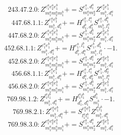 \documentclass[letterpaper,10pt,fleqn,leqno,onecolumn]{article}
\begin{document}
\begin{equation} \;\;\;\;\;\;  243.47.2.0: Z^{e_{1}^{a}e_{2}^{a}e_{1}^{b}}_{m_{1}^{a}m_{2}^{a}m_{1}^{b}}+=S^{e_{1}^{a},d_{1}^{a}}_{m_{1}^{a}m_{2}^{a}}Z^{e_{2}^{a}e_{1}^{b}}_{m_{1}^{b},d_{1}^{a}} \end{equation}
\begin{equation} \;\;\;\;\;\;  447.68.1.1: Z^{e_{1}^{a}e_{1}^{b}}_{m_{1}^{b},d_{1}^{a}}+=H^{e_{1}^{b},l_{1}^{a}}_{d_{1}^{b},d_{1}^{a}}S^{e_{1}^{a},d_{1}^{b}}_{m_{1}^{b},l_{1}^{a}} \end{equation}
\begin{equation} \;\;\;\;\;\;  447.68.2.0: Z^{e_{1}^{a}e_{2}^{a}e_{1}^{b}}_{m_{1}^{a}m_{2}^{a}m_{1}^{b}}+=S^{e_{1}^{a},d_{1}^{a}}_{m_{1}^{a}m_{2}^{a}}Z^{e_{2}^{a}e_{1}^{b}}_{m_{1}^{b},d_{1}^{a}} \end{equation}
\begin{equation} \;\;\;\;\;\;  452.68.1.1: Z^{e_{1}^{a}e_{1}^{b}}_{m_{1}^{b},d_{1}^{a}}+=H^{e_{1}^{a},l_{1}^{b}}_{d_{1}^{b},d_{1}^{a}}S^{e_{1}^{b},d_{1}^{b}}_{m_{1}^{b},l_{1}^{b}}\cdot -1. \end{equation}
\begin{equation} \;\;\;\;\;\;  452.68.2.0: Z^{e_{1}^{a}e_{2}^{a}e_{1}^{b}}_{m_{1}^{a}m_{2}^{a}m_{1}^{b}}+=S^{e_{1}^{a},d_{1}^{a}}_{m_{1}^{a}m_{2}^{a}}Z^{e_{2}^{a}e_{1}^{b}}_{m_{1}^{b},d_{1}^{a}} \end{equation}
\begin{equation} \;\;\;\;\;\;  456.68.1.1: Z^{e_{1}^{a}e_{1}^{b}}_{m_{1}^{b},d_{1}^{a}}+=H^{e_{1}^{a},l_{1}^{a}}_{d_{1}^{a},d_{2}^{a}}S^{e_{1}^{b},d_{2}^{a}}_{m_{1}^{b},l_{1}^{a}} \end{equation}
\begin{equation} \;\;\;\;\;\;  456.68.2.0: Z^{e_{1}^{a}e_{2}^{a}e_{1}^{b}}_{m_{1}^{a}m_{2}^{a}m_{1}^{b}}+=S^{e_{1}^{a},d_{1}^{a}}_{m_{1}^{a}m_{2}^{a}}Z^{e_{2}^{a}e_{1}^{b}}_{m_{1}^{b},d_{1}^{a}} \end{equation}
\begin{equation} \;\;\;\;\;\;  769.98.1.2: Z^{l_{1}^{a}l_{1}^{b}}_{m_{1}^{b},d_{1}^{a}}+=H^{l_{1}^{a}l_{1}^{b}}_{d_{1}^{b},d_{1}^{a}}S^{d_{1}^{b}}_{m_{1}^{b}}\cdot -1. \end{equation}
\begin{equation} \;\;\;\;\;\;  769.98.2.1: Z^{e_{1}^{a}e_{1}^{b}}_{m_{1}^{b},d_{1}^{a}}+=S^{e_{1}^{a}e_{1}^{b}}_{l_{1}^{a}l_{1}^{b}}Z^{l_{1}^{a}l_{1}^{b}}_{m_{1}^{b},d_{1}^{a}} \end{equation}
\begin{equation} \;\;\;\;\;\;  769.98.3.0: Z^{e_{1}^{a}e_{2}^{a}e_{1}^{b}}_{m_{1}^{a}m_{2}^{a}m_{1}^{b}}+=S^{e_{1}^{a},d_{1}^{a}}_{m_{1}^{a}m_{2}^{a}}Z^{e_{2}^{a}e_{1}^{b}}_{m_{1}^{b},d_{1}^{a}} \end{equation}
\end{document}
